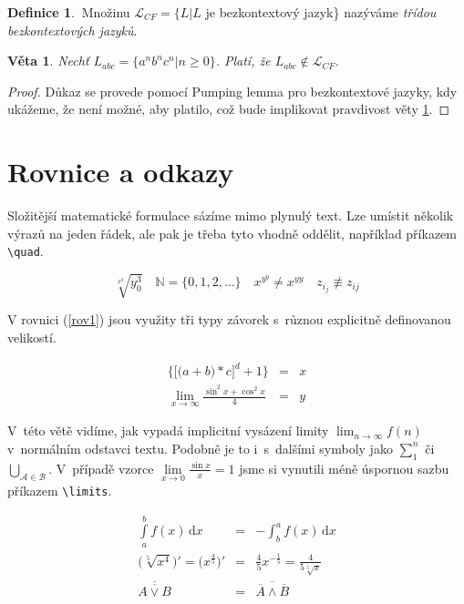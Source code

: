 \documentclass[a4paper, 11pt, twocolumn]{article}
\theoremstyle{definition}
\newtheorem{mydef}{Definice}[section]
\theoremstyle{plain}
\newtheorem{myveta}{Věta}
\begin{document}
\begin{mydef}
$\:$Množinu $\mathcal{L}_{CF}=\{L|L$ je bezkontextový jazyk\} nazýváme \emph{třídou bezkontextových jazyků}.
\end{mydef}

\begin{myveta}\label{veta}
Nechť $L_{abc}=\{a^nb^nc^n|n\geq 0\}$. Platí, že $L_{abc}\notin\mathcal{L}_{CF}$.
\end{myveta}

\begin{proof}
Důkaz se provede pomocí Pumping lemma pro bezkontextové jazyky, kdy ukážeme, že není možné, aby platilo, což bude implikovat pravdivost věty \ref{veta}.
\end{proof}

\section{Rovnice a odkazy}

Složitější matematické formulace sázíme mimo plynulý text. Lze umístit několik výrazů na jeden řádek, ale pak je třeba tyto vhodně oddělit, například příkazem \verb|\quad|.

$$\sqrt[x^2]{y^3_0}\quad\mathbb{N}=\{\mathrm{0,1,2,\dots}\}\quad x^{y^{y}}\neq x^{yy}\quad z_{i_j}\not\equiv z_{ij}$$

V rovnici (\ref{rov1}) jsou využity tři typy závorek s~různou explicitně definovanou velikostí.

\begin{eqnarray}\label{rov1}
\bigg\{\Big[\big(a+b\big)*c\Big]^d+1\bigg\} &=& x\\
\lim_{x\to\infty}\frac{\sin^{2}x+\cos^{2}x}{4} &=& y \nonumber
\end{eqnarray}

V~této větě vidíme, jak vypadá implicitní vysázení limity $\lim_{n\to\infty} f(n)$ v~normálním odstavci textu. Podobně je to i~s~dalšími symboly jako $\sum^n_1$ či $\bigcup_{\mathcal{A}\in\mathcal{B}}$. V~případě vzorce $\lim\limits_{x\to 0}\frac{\sin x}{x}=1$ jsme si vynutili méně úspornou sazbu příkazem \verb|\limits|.

\begin{eqnarray}
\int\limits_a^b f(x)\,\mathrm{d}x &=& -\int_b^a f(x)\,\mathrm{d}x \\
\Big( \sqrt[5]{x^4}\Big)' = \Big( x^{\frac{4}{5}}\Big)' &=& \frac{4}{5}x^{-\frac{1}{5}} = \frac{4}{5\sqrt[5]{x}} \\
\overline{\overline{A\vee B}} &=& \overline{\overline{A}\wedge\overline{B}}
\end{eqnarray}
\end{document}
